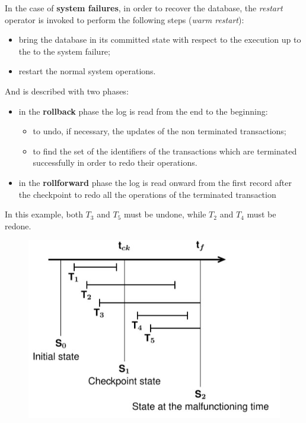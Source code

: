 In the case of \textbf{system failures}, in order to recover the database, the \textit{restart} operator is invoked to perform the following steps (\textit{warm restart}):

\begin{itemize}
    \item bring the database in its committed state with respect to the execution up to the to the system failure;
    \item restart the normal system operations.
\end{itemize}

And is described with two phases: 

\begin{itemize}

    \item in the \textbf{rollback} phase the log is read from the end to the beginning:
    
    \begin{itemize}
    
        \item to undo, if necessary, the updates of the non terminated transactions;
        
        \item to find the set of the identifiers of the transactions which are terminated successfully in order to redo their operations.
        
    \end{itemize}

    \item in the \textbf{rollforward} phase the log is read onward from the first record after the checkpoint to redo all the operations of the terminated transaction
    
\end{itemize}

In this example, both $T_3$ and $T_5$ must be undone, while $T_2$ and $T_4$ must be redone.

\begin{figure}[h!]
		\centering
		\includegraphics[scale = 1.3]{img/tr8.jpg}
		\label{tr2}
\end{figure}

